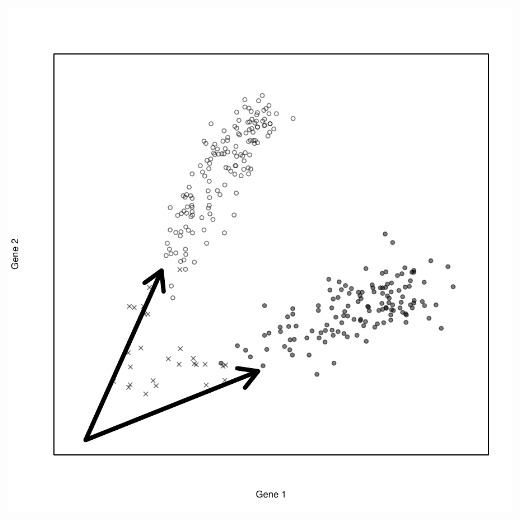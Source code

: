 \documentclass{article}\usepackage[]{graphicx}\usepackage[]{color}
\makeatletter
\def\maxwidth{ %
  \ifdim\Gin@nat@width>\linewidth
    \linewidth
  \else
    \Gin@nat@width
  \fi
}
\newenvironment{knitrout}{}{} %
\makeatother
\begin{document}
\begin{knitrout}
{\centering \includegraphics[width=\maxwidth]{figure/plots-4} 

}



\end{knitrout}
\end{document}
